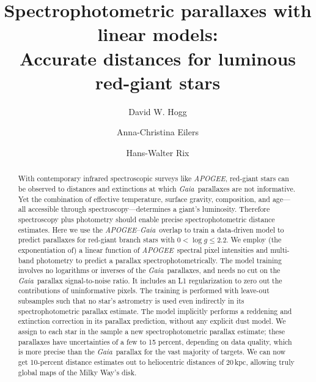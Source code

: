 \documentclass[modern]{aastex62}
\newcommand{\acronym}[1]{{\small{#1}}}
\newcommand{\project}[1]{\textsl{#1}}
\newcommand{\apogee}{\project{\acronym{APOGEE}}}
\newcommand{\gaia}{\project{Gaia}}
\newcommand{\logg}{\log g}
\begin{document}
\sloppy\sloppypar\raggedbottom\frenchspacing %

\title{\textbf{%
Spectrophotometric parallaxes with linear models:\\
Accurate distances for luminous red-giant stars
}}

\author[0000-0003-2866-9403]{David W. Hogg}

\author[0000-0003-2895-6218]{Anna-Christina Eilers}

\author[0000-0003-4996-9069]{Hans-Walter Rix}

\begin{abstract}\noindent
With contemporary infrared spectroscopic surveys like \apogee,
red-giant stars can be observed to distances and extinctions
at which \gaia\ parallaxes are not informative.
Yet the combination of effective temperature, surface gravity, composition, and age---all
accessible through spectroscopy---determines a giant's luminosity.
Therefore spectroscopy plus photometry should enable 
precise spectrophotometric distance estimates.
Here we use the \apogee--\gaia\ overlap to train a data-driven model
to predict parallaxes for red-giant branch stars with $0<\logg\leq2.2$.
We employ (the exponentiation of)
a linear function of \apogee\ spectral pixel intensities and multi-band photometry
to predict a parallax spectrophotometrically.
The model training involves no logarithms or inverses of the \gaia\ parallaxes,
and needs no cut on the \gaia\ parallax signal-to-noise ratio.
It includes an L1 regularization to zero out the contributions of
uninformative pixels.
The training is performed
with leave-out subsamples such that no star's astrometry is used even indirectly in its
spectrophotometric parallax estimate.
The model implicitly performs a reddening and extinction correction in its parallax prediction,
without any explicit dust model.
We assign to each star in the sample a new spectrophotometric parallax estimate;
these parallaxes have uncertainties of a few to 15 percent, depending on data quality,
which is more precise than the \gaia\ parallax for the vast majority of targets.
We can now get 10-percent distance estimates out to heliocentric distances of 20\,kpc,
allowing truly global maps of the Milky Way's disk.
\end{abstract}
\end{document}

